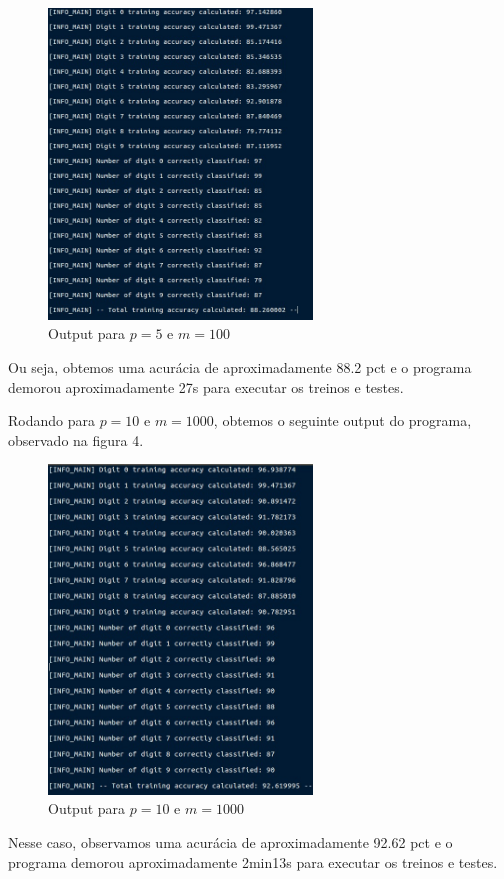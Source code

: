 \documentclass[twocolumn,amsmath,amssymb,floatfix]{revtex4}
\begin{document}
\begin{figure}[h!]
  \centering
  \includegraphics[width=7cm]{OUTPUT1.jpeg}
  \caption{Output para $p=5$ e $m=100$}
\end{figure}

Ou seja, obtemos uma acurácia de aproximadamente 88.2 pct e o programa demorou aproximadamente 27s para executar os treinos e testes.

Rodando para $p=10$ e $m=1000$, obtemos o seguinte output do programa, observado na figura 4.

\begin{figure}[h]
  \centering
  \includegraphics[width=7cm]{OUTPUT2.jpeg}
  \caption{Output para $p=10$ e $m=1000$}
\end{figure}

Nesse caso, observamos uma acurácia de aproximadamente 92.62 pct e o programa demorou aproximadamente 2min13s para executar os treinos e testes.
\end{document}
